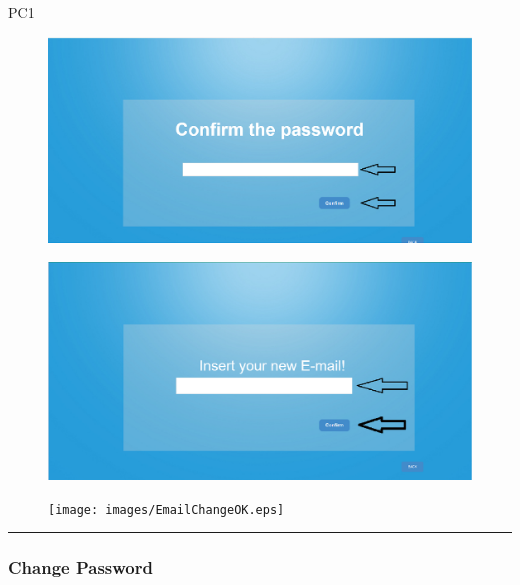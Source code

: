 \begin{lyxlist}{PC1}
\begin{figure}[H]
\centering
\includegraphics[width=170mm]{images/ComfirmField.eps}
\caption{\label{overflow}}
\end{figure}

\begin{figure}[H]
\centering
\includegraphics[width=170mm]{images/EmailChange1.eps}
\caption{\label{overflow}}
\end{figure}

\begin{figure}[H]
\centering
\texttt{[image: images/EmailChangeOK.eps]}
\caption{\label{overflow}}
\end{figure}


\end{lyxlist}
\hrule


\subsubsection{Change Password}

